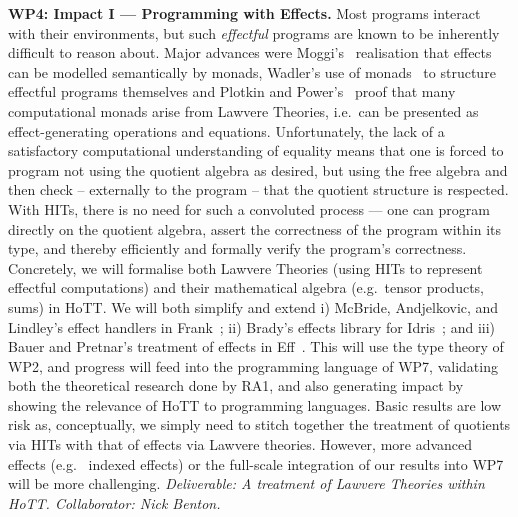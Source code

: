 \documentclass[a4paper,11pt]{article}
\newcommand{\eg}{{e.g.}\ }
\begin{document}
{\bf WP4: Impact I --- Programming with Effects.}  Most programs
interact with their environments, but such \emph{effectful} programs
are known to be inherently difficult to reason about.  Major advances
were Moggi's~\cite{moggi:monad} realisation that effects can be
modelled semantically by monads, Wadler's use of monads~\cite{} to structure
effectful programs themselves and Plotkin and
Power's~\cite{PlotkinPower:Lawvere} proof that many computational
monads arise from Lawvere Theories, i.e.\ can be presented as
effect-generating operations and equations.  Unfortunately, the lack
of a satisfactory computational understanding of equality means that
one is forced to program not using the
quotient algebra as desired, but using the free algebra and then check
-- externally to the program -- that the quotient structure is
respected.  With HITs, there is no need for such a convoluted process
--- one can program directly on the quotient algebra, assert the
correctness of the program within its type, and thereby efficiently
and formally verify the program's correctness. Concretely, we will
formalise both Lawvere Theories (using HITs to represent effectful
computations) and their mathematical algebra (e.g.\ tensor products,
sums) in HoTT.  We will both simplify and extend i) McBride,
Andjelkovic, and Lindley's effect handlers in
Frank~\cite{conor:frank}; ii) Brady's effects library for
Idris~\cite{brady:effects}; and iii) Bauer and Pretnar's treatment of
effects in Eff~\cite{bauer:eff}.  This will use the type theory of
WP2, and progress will feed into the programming language of WP7,
validating both the theoretical research done by RA1, and also
generating impact by showing the relevance of HoTT to programming
languages. Basic results are low risk as, conceptually, we simply need
to stitch together the treatment of quotients via HITs with that of
effects via Lawvere theories.  However, more advanced effects (\eg
indexed effects) or the full-scale integration of our results into WP7
will be more challenging. {\em Deliverable: A treatment of Lawvere
  Theories within HoTT.  Collaborator: Nick Benton.  }
\end{document}
